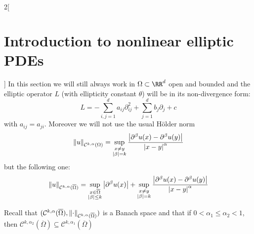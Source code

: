 \documentclass[../../../main_math.tex]{subfiles}
\begin{document}
\begin{multicols}{2}[\section{Introduction to nonlinear elliptic PDEs}]
  In this section we will still always work in $\Omega\subset\RR^d$ open and bounded and the elliptic operator $L$ (with ellipticity constant $\theta$) will be in its non-divergence form:
  $$
    L=-\sum_{i,j=1}^d a_{ij}\partial_{ij}^2+\sum_{j=1}^d b_j\partial_j+c
  $$
  with $a_{ij}=a_{ji}$.  Moreover we will not use the usual Hölder norm
  $$
    \norm{u}_{\mathcal{C}^{k,\alpha}(\Omega)}=\sup_{\substack{x\ne y\\ \abs{\beta}=k}}\frac{\abs{\partial^\beta u(x)-\partial^\beta u(y)}}{\abs{x-y}^\alpha}
  $$
  but the following one:
  $$
    \norm{u}_{\mathcal{C}^{k,\alpha}(\overline\Omega)}=\sup_{\substack{x\in \overline\Omega\\ \abs{\beta}\leq k}}\abs{\partial^\beta u(x)}+\sup_{\substack{x\ne y\\ \abs{\beta}=k}}\frac{\abs{\partial^\beta u(x)-\partial^\beta u(y)}}{\abs{x-y}^\alpha}
  $$

  \begin{remark}
    Recall that $(\mathcal{C}^{k,\alpha}(\overline\Omega),\norm{\cdot}_{\mathcal{C}^{k,\alpha}(\overline\Omega)})$ is a Banach space and that if $0<\alpha_1\leq\alpha_2<1$, then $
      \mathcal{C}^{k,\alpha_2}(\overline{\Omega})\subseteq \mathcal{C}^{k,\alpha_1}(\overline{\Omega})$
  \end{remark}


\end{multicols}
\end{document}

